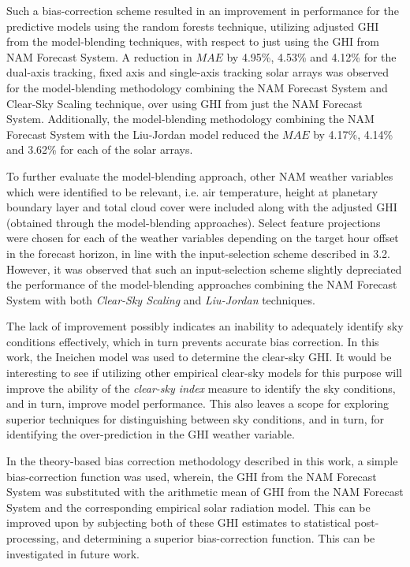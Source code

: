 \par Such a bias-correction scheme resulted in an improvement in performance for the predictive models using the random forests technique, utilizing adjusted GHI from the model-blending techniques, with respect to just using the GHI from NAM Forecast System. A reduction in $MAE$ by 4.95\%, 4.53\% and 4.12\% for the dual-axis tracking, fixed axis and single-axis tracking solar arrays was observed for the model-blending methodology combining the NAM Forecast System and Clear-Sky Scaling technique, over using GHI from just the NAM Forecast System. Additionally, the model-blending methodology combining the NAM Forecast System with the Liu-Jordan model reduced the $MAE$ by 4.17\%, 4.14\% and 3.62\% for each of the solar arrays.

\par To further evaluate the model-blending approach, other NAM weather variables which were identified to be relevant, i.e. air temperature, height at planetary boundary layer and total cloud cover were included along with the adjusted GHI (obtained through the model-blending approaches). Select feature projections were chosen for each of the weather variables depending on the target hour offset in the forecast horizon, in line with the input-selection scheme described in 3.2. However, it was observed that such an input-selection scheme slightly depreciated the performance of the model-blending approaches combining the NAM Forecast System with both \textit{Clear-Sky Scaling} and \textit{Liu-Jordan} techniques.

\par The lack of improvement possibly indicates an inability to adequately identify sky conditions effectively, which in turn prevents accurate bias correction. In this work, the Ineichen model was used to determine the clear-sky GHI. It would be interesting to see if utilizing other empirical clear-sky models for this purpose will improve the ability of the \textit{clear-sky index} measure to identify the sky conditions, and in turn, improve model performance. This also leaves a scope for exploring superior techniques for distinguishing between sky conditions, and in turn, for identifying the over-prediction in the GHI weather variable.

\par In the theory-based bias correction methodology described in this work, a simple bias-correction function was used, wherein, the GHI from the NAM Forecast System was substituted with the arithmetic mean of GHI from the NAM Forecast System and the corresponding empirical solar radiation model. This can be improved upon by subjecting both of these GHI estimates to statistical post-processing, and determining a superior bias-correction function. This can be investigated in future work.

